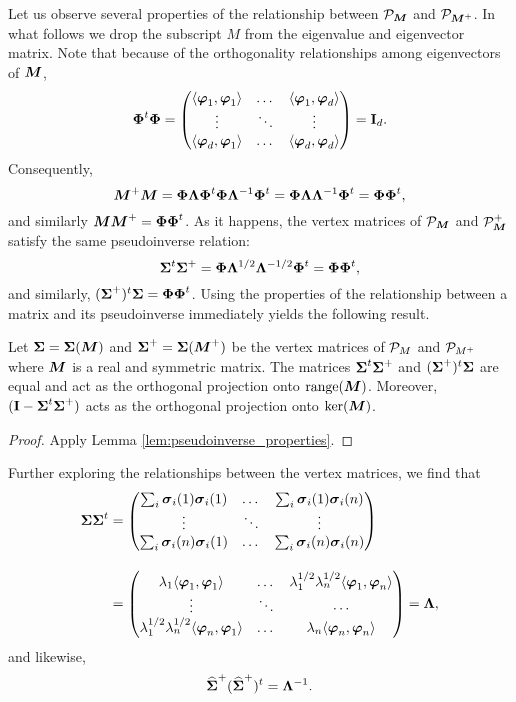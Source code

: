 Let us observe several properties of the relationship between $\P_\M$ and $\P_{\M^+}$. In what follows we drop the subscript $M$ from the eigenvalue and eigenvector matrix. Note that because of the orthogonality relationships among eigenvectors of $\M$, 
\[\Eig^\tp \Eig = \begin{pmatrix}
\la \vp_1,\vp_1\ra & \dots & \la \vp_1,\vp_d \ra \\
\vdots & \ddots & \vdots \\
\la \vp_d,\vp_1\ra & \dots & \la \vp_d,\vp_d\ra
\end{pmatrix} = \I_d.\]
Consequently, 
\begin{equation*}
\M^+\M = \Eig\Eval\Eig^\tp \Eig\Eval^{-1}\Eig^\tp = \Eig\Eval\Eval^{-1}\Eig^\tp = \Eig\Eig^\tp,
\end{equation*}
and similarly $\M\M^+= \Eig\Eig^\tp$. As it happens, the vertex matrices of $\P_\M$ and $\P_\M^+$ satisfy the same pseudoinverse relation: 
\begin{equation*}
\Sv^\tp\Sv^+ = \Eig \Eval^{1/2}\Eval^{-1/2}\Eig^\tp = \Eig\Eig^\tp, 
\end{equation*}
and similarly, $(\Sv^+)^\tp\Sv = \Eig\Eig^\tp$. Using the properties of the relationship between a matrix and its pseudoinverse immediately yields the following result. 

\begin{lemma}
\label{lem:vertex_matrices_pseudoinverse}
	Let $\Sv=\Sv(\M)$ and $\Sv^+=\Sv(\M^+)$ be the vertex matrices of $\P_M$ and $\P_{M^+}$ where $\M$ is a real and symmetric matrix. The matrices $\Sv^\tp\Sv^+$ and $(\Sv^+)^\tp\Sv$ are equal and act as the orthogonal projection onto $\range(\M)$.  Moreover,  $(\I-\Sv^\tp\Sv^+)$ acts as the orthogonal projection onto $\ker(\M)$. 
\end{lemma}
\begin{proof}
	Apply Lemma \ref{lem:pseudoinverse_properties}. 
\end{proof}

Further exploring the relationships between the vertex matrices,  we find that 
\begin{align}
\Sv\Sv^\tp &= 
\begin{pmatrix}
\sum_i \sv_i(1)\sv_i(1) & \dots & \sum_i \sv_i(1)\sv_i(n) \\
\vdots &\ddots  & \vdots \\
\sum_i \sv_i(n)\sv_i(1) & \dots & \sum_i \sv_i(n)\sv_i(n)
\end{pmatrix}\notag 
\\[10pt] 
&= 
\begin{pmatrix}
\lambda_1 \la \vp_1,\vp_1\ra & \dots & \lambda_1^{1/2}\lambda_n^{1/2}\la \vp_1,\vp_n\ra \\
\vdots & \ddots & \cdots \\
\lambda_1^{1/2}\lambda_n^{1/2}\la \vp_n,\vp_1\ra & \dots &\lambda_n \la \vp_n,\vp_n\ra 
\end{pmatrix} = \Eval,\label{eq:SvSv^t}
\end{align}
and likewise, 
\begin{equation}
\label{eq:SvSv+}
\Svn^+(\Svn^+)^\tp = \Eval^{-1}.
\end{equation}

